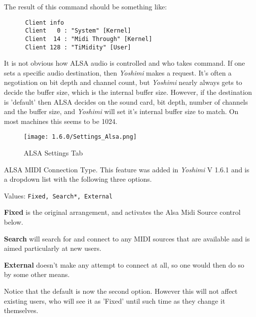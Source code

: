    The result of this command should be something like:

   \begin{verbatim}
      Client info
      Client   0 : "System" [Kernel]
      Client  14 : "Midi Through" [Kernel]
      Client 128 : "TiMidity" [User]
   \end{verbatim}

   It is not obvious how ALSA audio is controlled and who takes command.  If
   one sets a specific audio destination, then \textsl{Yoshimi} makes a
   request.  It's often a negotiation on bit depth and channel count, but
   \textsl{Yoshimi} nearly always gets to decide the buffer size, which is the
   internal buffer size.  However, if the destination is 'default' then ALSA
   decides on the sound card, bit depth, number of channels and the buffer
   size, and \textsl{Yoshimi} will set it's internal buffer size to match.  On
   most machines this seems to be 1024.

\begin{figure}[H]
   \centering
   \texttt{[image: 1.6.0/Settings\_Alsa.png]}
   \caption[ALSA Settings]{ALSA Settings Tab}
   \label{fig:yoshimi_settings_alsa_tab}
\end{figure}

   \setcounter{ItemCounter}{0}      %

   ALSA MIDI Connection Type.
   This feature was added in \textsl{Yoshimi} V 1.6.1 and is a dropdown
   list with the following three options.

   Values: \texttt{Fixed, Search*, External}

   \textbf{Fixed} is the original arrangement, and activates the Alsa Midi Source
   control below.

   \textbf{Search} will search for and connect to any MIDI sources that are
   available and is aimed particularly at new users.

   \textbf{External} doesn't make any attempt to connect at all, so one would
   then do so by some other means.

   Notice that the default is now the second option. However this will not
   affect existing users, who will see it as 'Fixed' until such time as they
   change it themselves.

